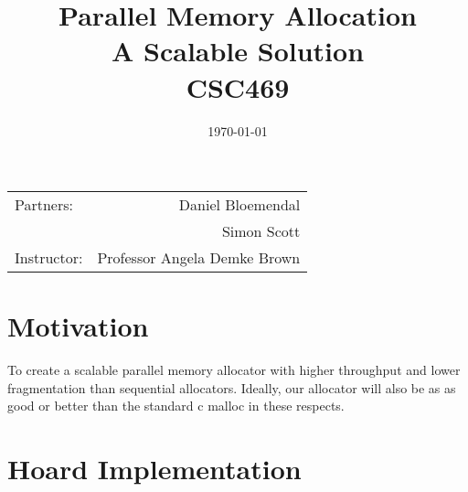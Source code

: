 \documentclass[11pt]{article}
\title{Parallel Memory Allocation \\ A Scalable Solution \\ CSC469} %
\date{\today} %
\begin{document}
\maketitle %

\begin{center}
\begin{tabular}{l r}
Partners: & Daniel Bloemendal \\ %
& Simon Scott \\
Instructor: & Professor Angela Demke Brown %
\end{tabular}
\end{center}



\section{Motivation}

\indent \indent To create a scalable parallel memory allocator with higher throughput and lower fragmentation than sequential allocators.  Ideally, our allocator will also be as as good or better than the standard c malloc in these respects.


\section{Hoard Implementation}
\end{document}
